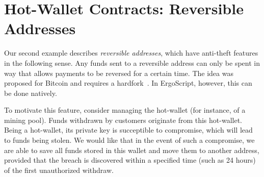 \documentclass[runningheads]{llncs}
\newcommand{\langname}{ErgoScript\xspace}
\begin{document}
\section{Hot-Wallet Contracts: Reversible Addresses}

Our second example describes {\em reversible addresses}, which have anti-theft features in the following sense. 
Any funds sent to a reversible address can only be spent in way that allows payments to be reversed for a certain time. The idea was proposed for Bitcoin and requires a hardfork~\cite{raddress}. In \langname, however, this can be done natively.

To motivate this feature, consider managing the hot-wallet (for instance, of a mining pool). Funds withdrawn by customers originate from this hot-wallet. Being a hot-wallet, its private key is succeptible to compromise, which will lead to funds being stolen. %
We would like that in the event of such a compromise, we are able to save all funds stored in this wallet and move them to another address, provided that the breach is discovered within a specified time (such as 24 hours) of the first unauthorized withdraw. 

\end{document}
